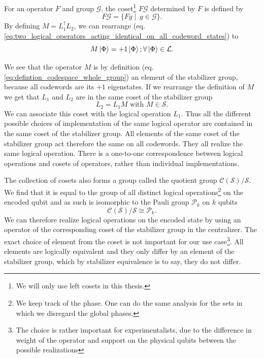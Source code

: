 For an operator $F$ and group $\mathcal{G}$, the coset\footnote{We will only use left cosets in this thesis.} $F\mathcal{G}$ determined by $F$ is defined by
\begin{equation}
    F \mathcal{G} = \{F g \mid \ g \in \mathcal{G}\}.
\end{equation}
By defining $M =  L_1^\dag L_2$, we can rearrange (eq. \eqref{eq:two_logical_operators_acting_identical_on_all_codeword_states}) to
\begin{equation}
    M \ket{\Phi} = +1\ket{\Phi}  ; \forall \ket{\Phi}\in \mathcal{L}.
\end{equation}

We see that the operator $M$ is by definition (eq. \eqref{eq:defintion_codespace_whole_group}) an element of the stabilizer group, because all codewords are its $+1$ eigenstates.
If we rearrange the definition of $M$ we get that $L_1$ and $L_2$ are in the same coset of the stabilizer group
\begin{equation}
    L_2 = L_1 M \text{ with } M \in \mathcal{S}.
\end{equation}
We can associate this coset with the logical operation $L_1$.
Thus all the different possible choices of implementation of the same logical operator are contained in the same coset of the stabilizer group.
All elements of the same coset of the stabilizer group act therefore the same on all codewords.
They all realize the same logical operation. 
There is a one-to-one correspondence between logical operations and cosets of operators, rather than individual implementations.

The collection of cosets also forms a group called the quotient group $\mathcal{C}(\mathcal{S})/\mathcal{S}$. 
We find that it is equal to the group of all distinct logical operations\footnote{
    We keep track of the phase. One can do the same analysis for the sets in which we disregard the global phases.
} on the encoded qubit and as such is isomorphic to the Pauli group $\mathcal{P}_k$ on $k$ qubits
\begin{equation}
    \mathcal{C}(\mathcal{S})/\mathcal{S} \cong \mathcal{P}_k.
    \label{eq:centralizer_stbailizer_quotient_group_logicals}
\end{equation}
We can therefore realize logical operations on the encoded state by using an operator of the corresponding coset of the stabilizer group in the centralizer.
The exact choice of element from the coset is not important for our use case\footnote{
    The choice is rather important for experimentalists, due to the difference in weight of the operator and support on the physical qubits between the possible realizations 
    }. 
All elements are logically equivalent and they only differ by an element of the stabilizer group, 
which by stabilizer equivalence is to say, they do not differ. 

